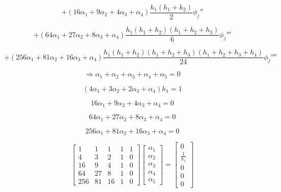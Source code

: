 \documentclass[12pt,a4paper]{report}
\begin{document}
\begin{enumerate}
$$+ \left(16\alpha_1 + 9\alpha_2 + 4\alpha_3 + \alpha_4\right)\frac{h_1\left(h_1 + h_2\right)}{2}{\phi_j}''$$

$$+ \left(64\alpha_1 + 27\alpha_2 + 8\alpha_3 + \alpha_4\right)\frac{h_1\left(h_1 + h_2\right)\left(h_1 + h_2 + h_3\right)}{6}{\phi_j}'''$$

$$+ \left(256\alpha_1 + 81\alpha_2 + 16\alpha_3 + \alpha_4\right)\frac{h_1\left(h_1 + h_2\right)\left(h_1 + h_2 + h_3\right)\left(h_1 + h_2 + h_3 + h_4\right)}{24}{\phi_j}''''$$

$$\Rightarrow \alpha_1 + \alpha_2 + \alpha_3 + \alpha_4 + \alpha_5 = 0$$

$$\left(4\alpha_1 + 3\alpha_2 + 2\alpha_3 + \alpha_4\right)h_1 = 1$$

$$16\alpha_1 + 9\alpha_2 + 4\alpha_3 + \alpha_4 = 0$$

$$64\alpha_1 + 27\alpha_2 + 8\alpha_3 + \alpha_4 = 0$$

$$256\alpha_1 + 81\alpha_2 + 16\alpha_3 + \alpha_4 = 0$$

$$\begin{bmatrix}
1 & 1 & 1 & 1 & 1 \\
4 & 3 & 2 & 1 & 0 \\
16 & 9 & 4 & 1 & 0 \\
64 & 27 & 8 & 1 & 0 \\
256 & 81 & 16 & 1 & 0
\end{bmatrix}
\begin{bmatrix}
\alpha_1 \\ \alpha_2 \\ \alpha_3 \\ \alpha_4 \\ \alpha_5
\end{bmatrix} = 
\begin{bmatrix}
0 \\ \frac{1}{h_1} \\ 0 \\ 0 \\ 0
\end{bmatrix}$$

\pagebreak


\end{enumerate}
\end{document}
